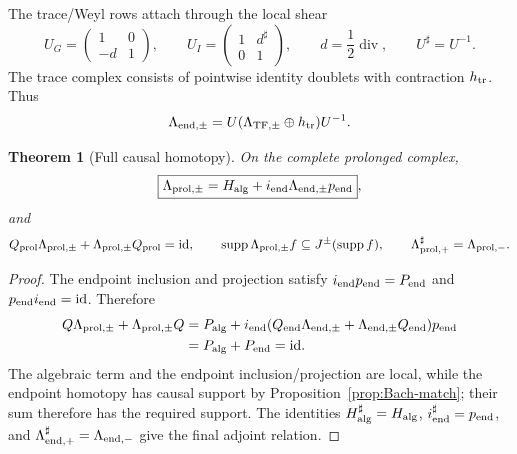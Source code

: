 \documentclass[11pt]{article}
\newtheorem{theorem}{Theorem}[section]
\theoremstyle{definition}
\theoremstyle{remark}
\newcommand{\id}{\mathrm{id}}
\newcommand{\supp}{\operatorname{supp}}
\begin{document}
The trace/Weyl rows attach through the local shear
\begin{equation}\label{eq:shear}
 U_G=\begin{pmatrix}1&0\\-d&1\end{pmatrix},
 \qquad
 U_I=\begin{pmatrix}1&d^\sharp\\0&1\end{pmatrix},
 \qquad d=\frac12\operatorname{div},
 \qquad U^\sharp=U^{-1}.
\end{equation}
The trace complex consists of pointwise identity doublets with contraction
$h_{\rm tr}$.  Thus
\begin{equation}\label{eq:endpoint-homotopy}
 \Lambda_{{\rm end},\pm}
 =U(\Lambda_{{\rm TF},\pm}\oplus h_{\rm tr})U^{-1}.
\end{equation}

\begin{theorem}[Full causal homotopy]\label{thm:full-homotopy}
On the complete prolonged complex,
\begin{equation}\label{eq:full-homotopy}
 \boxed{
 \Lambda_{{\rm prol},\pm}
 =H_{\rm alg}
 +i_{\rm end}\Lambda_{{\rm end},\pm}p_{\rm end}},
\end{equation}
and
\begin{equation}\label{eq:full-properties}
 Q_{\rm prol}\Lambda_{{\rm prol},\pm}
 +\Lambda_{{\rm prol},\pm}Q_{\rm prol}=\id,
 \qquad
 \supp\Lambda_{{\rm prol},\pm}f\subseteq J^\pm(\supp f),
 \qquad
 \Lambda_{{\rm prol},+}^\sharp=\Lambda_{{\rm prol},-}.
\end{equation}
\end{theorem}

\begin{proof}
The endpoint inclusion and projection satisfy
$i_{\rm end}p_{\rm end}=P_{\rm end}$ and
$p_{\rm end}i_{\rm end}=\id$.  Therefore
\begin{align*}
 Q\Lambda_{{\rm prol},\pm}+\Lambda_{{\rm prol},\pm}Q
 &=P_{\rm alg}
 +i_{\rm end}
   (Q_{\rm end}\Lambda_{{\rm end},\pm}
    +\Lambda_{{\rm end},\pm}Q_{\rm end})p_{\rm end}\\
 &=P_{\rm alg}+P_{\rm end}=\id.
\end{align*}
The algebraic term and the endpoint inclusion/projection are local, while
the endpoint homotopy has causal support by
Proposition~\ref{prop:Bach-match}; their sum therefore has the required
support.  The identities $H_{\rm alg}^\sharp=H_{\rm alg}$,
$i_{\rm end}^\sharp=p_{\rm end}$, and
$\Lambda_{{\rm end},+}^\sharp=\Lambda_{{\rm end},-}$ give the final adjoint
relation.
\end{proof}
\end{document}
